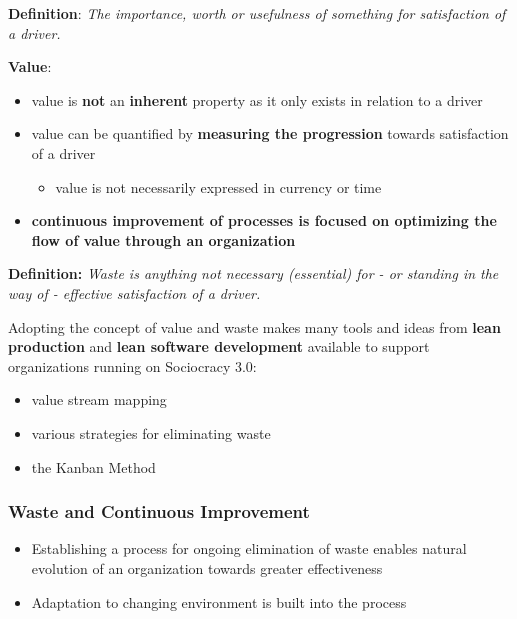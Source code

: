 \textbf{Definition}: \emph{The importance, worth or usefulness of something for satisfaction of a driver.}

\textbf{Value}:

\begin{itemize}
\item value is \textbf{not} an \textbf{inherent} property as it only exists in relation to a driver

\item value can be quantified by \textbf{measuring the progression} towards satisfaction of a driver

\begin{itemize}
\item value is not necessarily expressed in currency or time

\end{itemize}

\item \textbf{continuous improvement of processes is focused on optimizing the flow of value through an organization}

\end{itemize}

\textbf{Definition:} \emph{Waste is anything not necessary (essential) for - or standing in the way of - effective satisfaction of a driver.}

Adopting the concept of value and waste makes many tools and ideas from \textbf{lean production} and \textbf{lean software development} available to support organizations running on Sociocracy 3.0:

\begin{itemize}
\item value stream mapping

\item various strategies for eliminating waste

\item the Kanban Method

\end{itemize}

\subsubsection{Waste and Continuous Improvement}
\label{wasteandcontinuousimprovement}

\begin{itemize}
\item Establishing a process for ongoing elimination of waste enables natural evolution of an organization towards greater effectiveness

\item Adaptation to changing environment is built into the process

\end{itemize}

